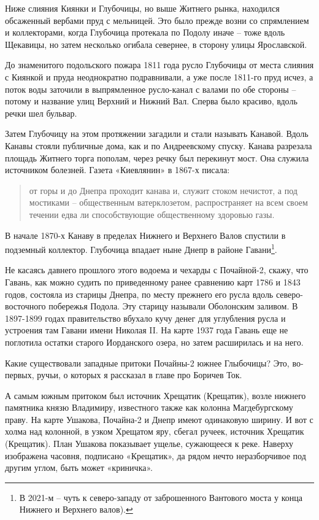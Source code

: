 Ниже слияния Киянки и Глубочицы, но выше Житнего рынка, находился обсаженный вербами пруд с мельницей. Это было прежде возни со спрямлением и коллекторами, когда Глубочица протекала по Подолу иначе – тоже вдоль Щекавицы, но затем несколько огибала севернее, в сторону улицы Ярославской. 

До знаменитого подольского пожара 1811 года русло Глубочицы от места слияния с Киянкой и пруда неоднократно подравнивали, а уже после 1811-го пруд исчез, а поток воды заточили в выпрямленное русло-канал с валами по обе стороны – потому и название улиц Верхний и Нижний Вал. Сперва было красиво, вдоль речки шел бульвар.

Затем Глубочицу на этом протяжении загадили и стали называть Канавой. Вдоль Канавы стояли публичные дома, как и по Андреевскому спуску. Канава разрезала площадь Житнего торга пополам, через речку был перекинут мост. Она служила источником болезней. Газета «Киевлянин» в 1867-х писала:

\begin{quotation}
от горы и до Днепра проходит канава и, служит стоком нечистот, а под мостиками – общественным ватерклозетом, распространяет на всем своем течении едва ли способствующие общественному здоровью газы.
\end{quotation}

В начале 1870-х Канаву в пределах Нижнего и Верхнего Валов спустили в подземный коллектор. Глубочица впадает ныне Днепр в районе Гавани\footnote{В 2021-м – чуть к северо-западу от заброшенного Вантового моста у конца Нижнего и Верхнего валов).}.

Не касаясь давнего прошлого этого водоема и чехарды с Почайной-2, скажу, что Гавань, как можно судить по приведенному ранее сравнению карт 1786 и 1843 годов, состояла из старицы Днепра, по месту прежнего его русла вдоль северо-восточного побережья Подола. Эту старицу называли Оболонским заливом. В 1897-1899 годах правительство вбухало кучу денег для углубления русла и устроения там Гавани имени Николая II. На карте 1937 года Гавань еще не поглотила остатки старого Иорданского озера, но затем расширилась и на него.

Какие существовали западные притоки Почайны-2 южнее Глыбочицы? Это, во-первых, ручьи, о которых я рассказал в главе про Боричев Ток.

А самым южным притоком был источник Хрещатик (Крещатик), возле нижнего памятника князю Владимиру, известного также как колонна Магдебургскому праву. На карте Ушакова, Почайна-2 и Днепр имеют одинаковую ширину. И вот с холма над колонной, в узком Хрещатом яру, сбегал ручеек, источник Хрещатик (Крещатик). План Ушакова показывает ущелье, сужающееся к реке. Наверху изображена часовня, подписано «Крещатик», да рядом нечто неразборчивое под другим углом, быть может «криничка».

